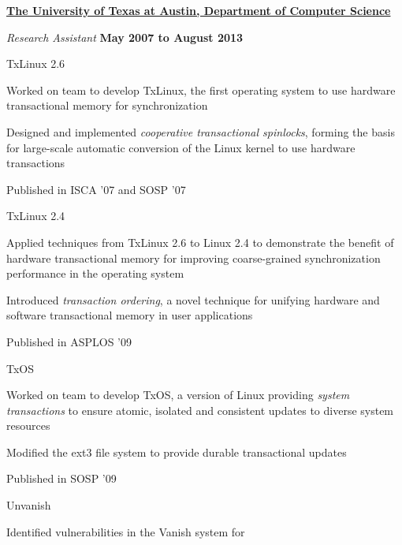 \href{http://www.cs.utexas.edu}{\textbf{The University of Texas at Austin,
Department of Computer Science}}
\begin{outerlist}

\item[] \textit{Research Assistant}%
    \hfill \textbf{May 2007 to August 2013}
    \begin{innerlist}
        \item TxLinux 2.6 
        \begin{innerlist}
           \item Worked on team to develop TxLinux, the first operating system
to use hardware transactional memory for synchronization
           \item Designed and implemented \emph{cooperative transactional
spinlocks}, forming the basis for large-scale automatic conversion of the
Linux kernel to use hardware transactions
           \item Published in ISCA '07 and SOSP '07
        \end{innerlist}
        \item TxLinux 2.4
        \begin{innerlist}
           \item Applied techniques from TxLinux 2.6 to Linux 2.4 to
demonstrate the benefit of hardware transactional memory for
improving coarse-grained synchronization performance in the operating
system
           \item Introduced \emph{transaction ordering}, a novel technique for
unifying hardware and software transactional memory in user applications
           \item Published in ASPLOS '09
        \end{innerlist}
        \item TxOS
        \begin{innerlist}
           \item Worked on team to develop TxOS, a version of Linux
providing \emph{system transactions} to ensure atomic, isolated and
consistent updates to diverse system resources
           \item Modified the ext3 file system to provide durable
transactional updates
           \item Published in SOSP '09
        \end{innerlist}
        \item Unvanish
        \begin{innerlist}
           \item Identified vulnerabilities in the Vanish system for

\end{innerlist}
\end{innerlist}
\end{outerlist}
